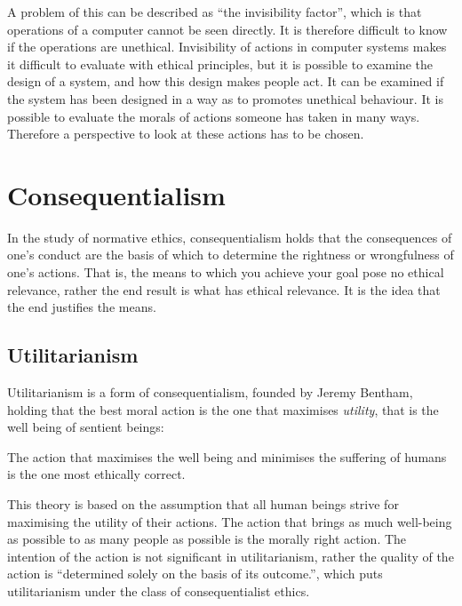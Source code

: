 A problem of this can be described as “the invisibility factor”, which is that operations of a computer cannot be seen directly. It is therefore difficult to know if the operations are unethical. \cite{moor1985computer} Invisibility of actions in computer systems makes it difficult to evaluate with ethical principles, but it is possible to examine the design of a system, and how this design makes people act. It can be examined if the system has been designed in a way as to promotes unethical behaviour. It is possible to evaluate the morals of actions someone has taken in many ways. Therefore a perspective to look at these actions has to be chosen.

\section{Consequentialism}
In the study of normative ethics, consequentialism holds that the consequences of one's conduct are the basis of which to determine the rightness or wrongfulness of one's actions. That is, the means to which you achieve your goal pose no ethical relevance, rather the end result is what has ethical relevance. It is the idea that the end justifies the means. \cite{mizzoni2009ethics}

\subsection{Utilitarianism}
Utilitarianism is a form of consequentialism, founded by Jeremy Bentham, holding that the best moral action is the one that maximises \textit{utility}, that is the well being of sentient beings:

\begin{quote}
	 \cite{holm2013philosophy}
\end{quote}

\noindent The action that maximises the well being and minimises the suffering of humans is the one most ethically correct.

This theory is based on the assumption that all human beings strive for maximising the utility of their actions. The action that brings as much well-being as possible to as many people as possible is the morally right action. The intention of the action is not significant in utilitarianism, rather the quality of the action is “determined solely on the basis of its outcome.”, which puts utilitarianism under the class of consequentialist ethics. \cite{holm2013philosophy}

